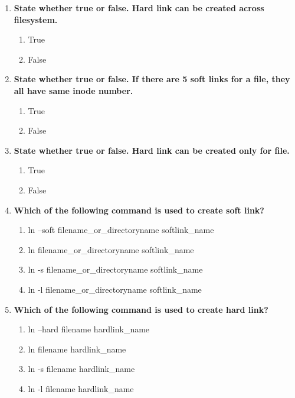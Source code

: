 \begin{flushleft}
\begin{enumerate}
		\item \textbf{State whether true or false. Hard link can be created across filesystem.}
		\begin{enumerate}[label=(\alph*)]
			\item True
			\item False   %
		\end{enumerate}
		\bigskip
		\bigskip	

		
		\item \textbf{State whether true or false. If there are 5 soft links for a file, they all have same inode number.}
		\begin{enumerate}[label=(\alph*)]
			\item True 
			\item False %
		\end{enumerate}
		\bigskip
		\bigskip	

		\item \textbf{State whether true or false. Hard link can be created only for file.}
		\begin{enumerate}[label=(\alph*)]
			\item True  %
			\item False 
		\end{enumerate}
		\bigskip
		\bigskip	
		
		\item \textbf{Which of the following command is used to create soft link?}
		\begin{enumerate}[label=(\alph*)]
			\item ln --soft filename\_or\_directoryname  softlink\_name
			\item ln filename\_or\_directoryname  softlink\_name
			\item ln -s filename\_or\_directoryname  softlink\_name %
			\item ln -l filename\_or\_directoryname  softlink\_name
		\end{enumerate}
		\bigskip
		\bigskip	
		
		\item \textbf{Which of the following command is used to create hard link?}
		\begin{enumerate}[label=(\alph*)]
			\item ln --hard filename  hardlink\_name
			\item ln filename  hardlink\_name   %
			\item ln -s filename  hardlink\_name 
			\item ln -l filename  hardlink\_name
		\end{enumerate}
		\bigskip
		\bigskip	
		
		
	\end{enumerate}
	
	
\end{flushleft}

\newpage

